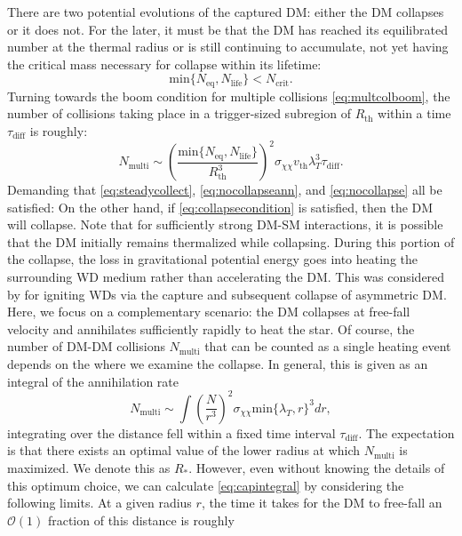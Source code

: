 \documentclass[preprintnumbers,amsmath,amssymb,prd,superscriptaddress]{revtex4}
\newcommand{\OO}{\mathcal{O}}
\def\r{\right)}
\def\l{\left(}
\begin{document}
There are two potential evolutions of the captured DM: either the DM collapses or it does not. 
For the later, it must be that the DM has reached its equilibrated number at the thermal radius or is still continuing to accumulate, not yet having the critical mass necessary for collapse within its lifetime:
\begin{equation}
\label{eq:nocollapseann}
\text{min}\{N_\text{eq}, N_\text{life}\} < N_\text{crit}.
\end{equation}
Turning towards the boom condition for multiple collisions \eqref{eq:multcolboom}, the number of collisions taking place in a trigger-sized subregion of $R_\text{th}$ within a time $\tau_\text{diff}$ is roughly:
\begin{equation}
\label{eq:nocollapse}
N_\text{multi} \sim \l \frac{\text{min}\{N_\text{eq}, N_\text{life}\}}{R_\text{th}^3} \r^2 \sigma_{\chi \chi} v_\text{th} \lambda_T^3 \tau_\text{diff}. 
\end{equation}
Demanding that \eqref{eq:steadycollect}, \eqref{eq:nocollapseann}, and \eqref{eq:nocollapse} all be satisfied:
On the other hand, if \eqref{eq:collapsecondition} is satisfied, then the DM will collapse.   
Note that for sufficiently strong DM-SM interactions, it is possible that the DM initially remains thermalized while collapsing.
During this portion of the collapse, the loss in gravitational potential energy goes into heating the surrounding WD medium rather than accelerating the DM. 
This was considered by \cite{Bramante} for igniting WDs via the capture and subsequent collapse of asymmetric DM.
Here, we focus on a complementary scenario: the DM collapses at free-fall velocity and annihilates sufficiently rapidly to heat the star. 
Of course, the number of DM-DM collisions $N_\text{multi}$ that can be counted as a single heating event depends on the where we examine the collapse. 
In general, this is given as an integral of the annihilation rate
\begin{equation}
\label{eq:capintegral}
N_\text{multi} \sim \int \l \frac{N}{r^3}\r^2 \sigma_{\chi \chi} \text{min}\{\lambda_T, r\}^3 dr,
\end{equation}
integrating over the distance fell within a fixed time interval $\tau_\text{diff}$. 
The expectation is that there exists an optimal value of the lower radius at which $N_\text{multi}$ is maximized.
We denote this as $R_*$. 
However, even without knowing the details of this optimum choice, we can calculate \eqref{eq:capintegral} by considering the following limits. 
At a given radius $r$, the time it takes for the DM to free-fall an $\OO(1)$ fraction of this distance is roughly
\end{document}
